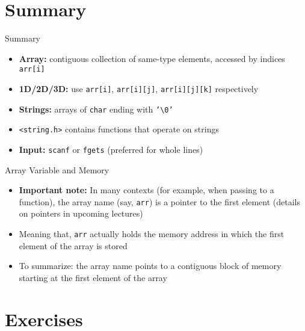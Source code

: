 \documentclass[12pt, aspectratio=169]{beamer}
\begin{document}


    \section{Summary}


    \begin{frame}{Summary}
        \begin{itemize}
            \item \textbf{Array:} contiguous collection of same-type elements, accessed by indices \texttt{arr[i]}
            \item \textbf{1D/2D/3D:} use \texttt{arr[i]}, \texttt{arr[i][j]}, \texttt{arr[i][j][k]} respectively
            \item \textbf{Strings:} arrays of \texttt{char} ending with \texttt{'\textbackslash0'}
            \item \texttt{<string.h>} contains functions that operate on strings
            \item \textbf{Input:} \texttt{scanf} or \texttt{fgets} (preferred for whole lines)
        \end{itemize}
    \end{frame}


    \begin{frame}{Array Variable and Memory}
        \begin{itemize}
            \item \textbf{Important note:} In many contexts (for example, when passing to a function), the array name (say, \texttt{arr}) is a pointer to the first element (details on pointers in upcoming lectures)
            \item Meaning that, \texttt{arr} actually holds the memory address in which the first element of the array is stored
            \item To summarize: the array name points to a contiguous block of memory starting at the first element of the array
        \end{itemize}
    \end{frame}



    \section{Exercises}
\end{document}
